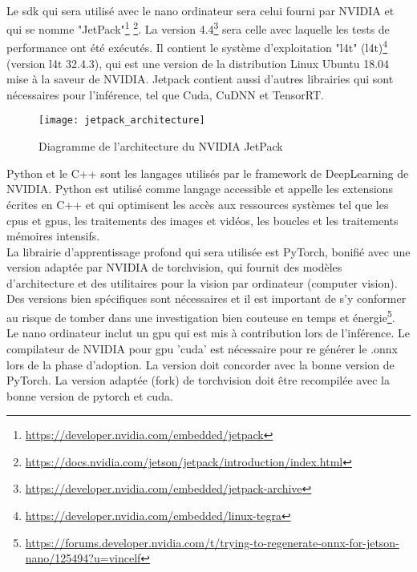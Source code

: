 \\
\noindent Le \acrshort{sdk} qui sera utilisé avec le nano ordinateur sera celui fourni par NVIDIA et qui se nomme "JetPack"\footnote{\url{https://developer.nvidia.com/embedded/jetpack}} \footnote{\url{https://docs.nvidia.com/jetson/jetpack/introduction/index.html}}. La version 4.4\footnote{\url{https://developer.nvidia.com/embedded/jetpack-archive}} sera celle avec laquelle les tests de performance ont été exécutés. Il contient le système d'exploitation "\acrlong{l4t}" (\acrshort{l4t})\footnote{\url{https://developer.nvidia.com/embedded/linux-tegra}} (version \acrshort{l4t} 32.4.3), qui est une version de la distribution Linux Ubuntu 18.04 mise à la saveur de NVIDIA. Jetpack contient aussi d'autres librairies qui sont nécessaires pour l'inférence, tel que Cuda, CuDNN et TensorRT.
\begin{figure}[H]
    \centering
    \texttt{[image: jetpack\_architecture]}
    \caption[Diagramme de l'architecture du NVIDIA JetPack]{Diagramme de l'architecture du NVIDIA JetPack\protect\footnotemark}
    \label{fig:jetpack_architecture}
\end{figure}
\noindent Python et le C++ sont les langages utilisés par le framework de DeepLearning de NVIDIA. Python est utilisé comme langage accessible et appelle les extensions écrites en C++ et qui optimisent les accès aux ressources systèmes tel que les \acrshort{cpu}s et \acrshort{gpu}s, les traitements des images et vidéos, les boucles et les traitements mémoires intensifs.
\vspace{\baselineskip}
\\
\noindent La librairie d’apprentissage profond qui sera utilisée est PyTorch, bonifié avec une version adaptée par NVIDIA de torchvision, qui fournit des modèles d'architecture et des utilitaires pour la vision par ordinateur (computer vision). Des versions bien spécifiques sont nécessaires et il est important de s'y conformer au risque de tomber dans une investigation bien couteuse en temps et énergie\footnote{\url{https://forums.developer.nvidia.com/t/trying-to-regenerate-onnx-for-jetson-nano/125494?u=vincelf}}.
\vspace{\baselineskip}
\\
\noindent Le nano ordinateur inclut un \acrshort{gpu} qui est mis à contribution lors de l'inférence. Le compilateur de NVIDIA pour \acrshort{gpu} 'cuda' est nécessaire pour re générer le .onnx lors de la phase d'adoption. La version doit concorder avec la bonne version de PyTorch. La version adaptée (fork) de torchvision doit être recompilée avec la bonne version de pytorch et cuda. 
